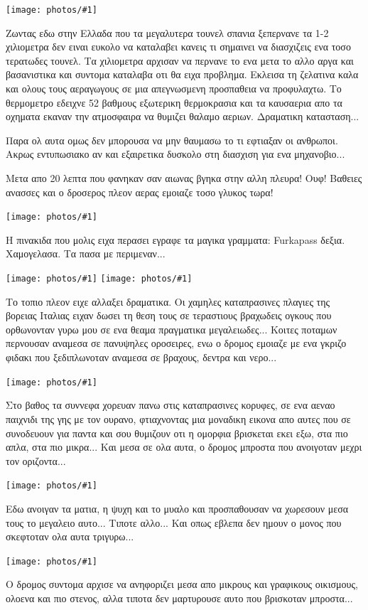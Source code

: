 \documentclass[11pt, letterpaper]{book}
\newcommand\photo[1]{\noindent\texttt{[image: photos/\#1]}}
\begin{document}
\photo{38.jpg}

Ζωντας εδω στην Ελλαδα που τα μεγαλυτερα τουνελ σπανια ξεπερνανε τα 1-2 χιλιομετρα δεν ειναι ευκολο να καταλαβει κανεις τι σημαινει να διασχιζεις ενα τοσο τερατωδες τουνελ. 
Τα χιλιομετρα αρχισαν να περνανε το ενα μετα το αλλο αργα και βασανιστικα και συντομα καταλαβα οτι θα ειχα προβλημα. Εκλεισα τη ζελατινα καλα και ολους τους αεραγωγους σε μια απεγνωσμενη προσπαθεια να προφυλαχτω. Το θερμομετρο εδειχνε 52 βαθμους εξωτερικη θερμοκρασια και τα καυσαερια απο τα οχηματα εκαναν την ατμοσφαιρα να θυμιζει θαλαμο αεριων. Δραματικη κατασταση...

Παρα ολ αυτα ομως δεν μπορουσα να μην θαυμασω το τι εφτιαξαν οι ανθρωποι. Ακρως εντυπωσιακο αν και εξαιρετικα δυσκολο στη διασχιση για ενα μηχανοβιο...

Μετα απο 20 λεπτα που φανηκαν σαν αιωνας βγηκα στην αλλη πλευρα! Ουφ! Βαθειες ανασσες και ο δροσερος πλεον αερας εμοιαζε τοσο γλυκος τωρα!

\photo{39.jpg}

Η πινακιδα που μολις ειχα περασει εγραφε τα μαγικα γραμματα: Furkapass δεξια. 
Χαμογελασα. Τα πασα με περιμεναν...

\photo{40.jpg}
\photo{41.jpg}

Το τοπιο πλεον ειχε αλλαξει δραματικα. Οι χαμηλες καταπρασινες πλαγιες της βορειας Ιταλιας ειχαν δωσει τη θεση τους σε τεραστιους βραχωδεις ογκους που ορθωνονταν γυρω μου σε ενα θεαμα πραγματικα μεγαλειωδες...
Κοιτες ποταμων περνουσαν αναμεσα σε πανυψηλες οροσειρες, ενω ο δρομος εμοιαζε με ενα γκριζο φιδακι που ξεδιπλωνοταν αναμεσα σε βραχους, δεντρα και νερο...

\photo{42.jpg}

Στο βαθος τα συννεφα χορευαν πανω στις καταπρασινες κορυφες, σε ενα αεναο παιχνιδι της γης με τον ουρανο, φτιαχνοντας μια μοναδικη εικονα απο αυτες που σε συνοδευουν για παντα και σου θυμιζουν οτι η ομορφια βρισκεται εκει εξω, στα πιο απλα, στα πιο μικρα... 
Και μεσα σε ολα αυτα, ο δρομος μπροστα που ανοιγοταν μεχρι τον οριζοντα... 

\photo{43.jpg}

Εδω ανοιγαν τα ματια, η ψυχη και το μυαλο και προσπαθουσαν να χωρεσουν μεσα τους το μεγαλειο αυτο... Τιποτε αλλο...
Και οπως εβλεπα δεν ημουν ο μονος που σκεφτοταν ολα αυτα τριγυρω... 

\photo{44.jpg}

O δρομος συντομα αρχισε να ανηφοριζει μεσα απο μικρους και γραφικους οικισμους, ολοενα και πιο στενος, αλλα τιποτα δεν μαρτυρουσε αυτο που βρισκοταν μπροστα...
\end{document}
